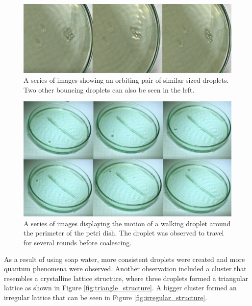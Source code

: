 \begin{figure}[htb]
\includegraphics[width=\textwidth]{prototype/exp_rep_imgs/orbit_droplets_interaction.jpg}
\centering
\caption{A series of images showing an orbiting pair of similar sized droplets. Two other bouncing droplets can also be seen in the left.}
\centering
\label{fig:orbit_droplets_interaction}
\end{figure}

\begin{figure}[htb]
\includegraphics[width=\textwidth]{prototype/exp_rep_imgs/double_slit_walking_perimeter.jpg}
\centering
\caption{A series of images displaying the motion of a walking droplet around the perimeter of the petri dish. The droplet was observed to travel for several rounds before coalescing.}
\centering
\label{fig:double_slit_walking_perimeter}
\end{figure}

As a  result of using soap water, more consistent droplets were created and more quantum phenomena were observed. Another observation included a cluster that resembles a crystalline lattice structure, where three droplets formed a triangular lattice as shown in Figure \ref{fig:triangle_structure}. A bigger cluster formed an irregular lattice that can be seen in Figure \ref{fig:irregular_structure}.

